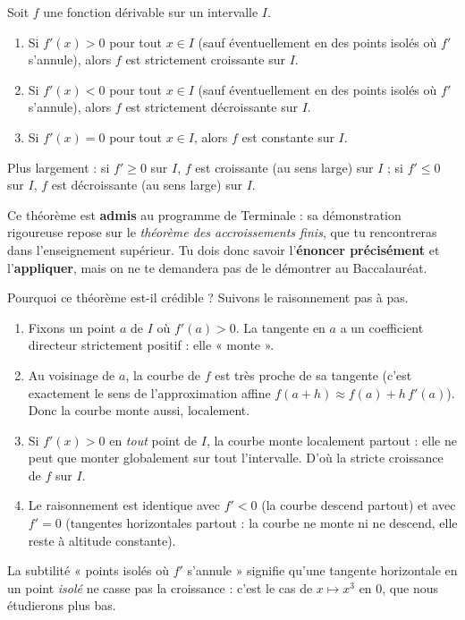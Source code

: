 \documentclass[11pt]{article}
\newcommand{\cle}[1]{{\popxbold\color{popdark}#1}}
\newcounter{popsec}
\newcounter{popsub}
\newcommand{\courssub}[1]{%
  \stepcounter{popsub}%
  \par\vspace{9pt}\noindent{\popxbold\fontsize{11.5}{13}\selectfont\color{popink}{\color{poporange}\thepopsec.\thepopsub}\hspace{6pt}#1}\par\nopagebreak\vspace{4pt}
}
\begin{document}
\courssub{Le théorème fondamental (admis)}

\begin{propriete}
Soit $f$ une fonction \cle{dérivable} sur un intervalle $I$.
\begin{enumerate}
\item Si $f'(x) > 0$ pour tout $x \in I$ (sauf éventuellement en des points isolés où $f'$ s'annule), alors $f$ est \cle{strictement croissante} sur $I$.
\item Si $f'(x) < 0$ pour tout $x \in I$ (sauf éventuellement en des points isolés où $f'$ s'annule), alors $f$ est \cle{strictement décroissante} sur $I$.
\item Si $f'(x) = 0$ pour tout $x \in I$, alors $f$ est \cle{constante} sur $I$.
\end{enumerate}
Plus largement : si $f' \geq 0$ sur $I$, $f$ est croissante (au sens large) sur $I$ ; si $f' \leq 0$ sur $I$, $f$ est décroissante (au sens large) sur $I$.
\end{propriete}

\begin{attention}
Ce théorème est \textbf{admis} au programme de Terminale : sa démonstration rigoureuse repose sur le \emph{théorème des accroissements finis}, que tu rencontreras dans l'enseignement supérieur. Tu dois donc savoir l'\textbf{énoncer précisément} et l'\textbf{appliquer}, mais on ne te demandera pas de le démontrer au Baccalauréat.
\end{attention}

\begin{experience}
Pourquoi ce théorème est-il crédible ? Suivons le raisonnement pas à pas.
\begin{enumerate}
\item Fixons un point $a$ de $I$ où $f'(a) > 0$. La tangente en $a$ a un coefficient directeur strictement positif : elle « monte ».
\item Au voisinage de $a$, la courbe de $f$ est très proche de sa tangente (c'est exactement le sens de l'approximation affine $f(a+h) \approx f(a) + h\,f'(a)$). Donc la courbe monte aussi, localement.
\item Si $f'(x) > 0$ en \emph{tout} point de $I$, la courbe monte localement partout : elle ne peut que monter globalement sur tout l'intervalle. D'où la stricte croissance de $f$ sur $I$.
\item Le raisonnement est identique avec $f' < 0$ (la courbe descend partout) et avec $f' = 0$ (tangentes horizontales partout : la courbe ne monte ni ne descend, elle reste à altitude constante).
\end{enumerate}
La subtilité « points isolés où $f'$ s'annule » signifie qu'une tangente horizontale en un point \emph{isolé} ne casse pas la croissance : c'est le cas de $x \mapsto x^3$ en $0$, que nous étudierons plus bas.
\end{experience}
\end{document}
